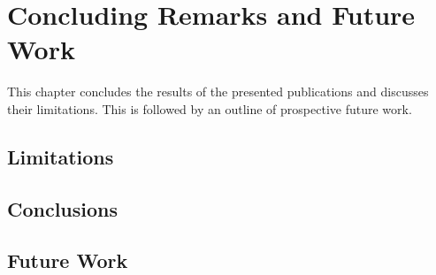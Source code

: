 \chapter{Concluding Remarks and Future Work}\label{chap:conclusions-future-work}%
\vspace{5pt}
\chaptertoc
{}

\noindent
This chapter concludes the results of the presented publications and discusses their limitations.
This is followed by an outline of prospective future work.

\section{Limitations}


\section{Conclusions}

\section{Future Work}
%


